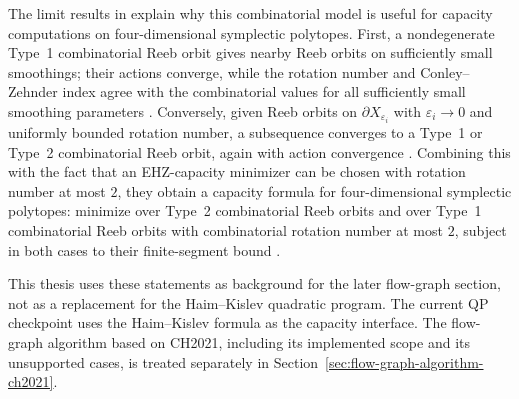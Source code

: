 The limit results in \cite{CH2021} explain why this combinatorial model is
useful for capacity computations on four-dimensional symplectic polytopes.
First, a nondegenerate Type~1 combinatorial Reeb orbit gives nearby Reeb orbits
on sufficiently small smoothings; their actions converge, while the rotation
number and Conley--Zehnder index agree with the combinatorial values for all
sufficiently small smoothing parameters \cite[Theorem~1.8]{CH2021}. Conversely,
given Reeb orbits on \(\partial X_{\varepsilon_i}\) with
\(\varepsilon_i\to0\) and uniformly bounded rotation number, a subsequence
converges to a Type~1 or Type~2 combinatorial Reeb orbit, again with action
convergence \cite[Theorem~1.9]{CH2021}. Combining this with the fact that an
EHZ-capacity minimizer can be chosen with rotation number at most \(2\), they
obtain a capacity formula for four-dimensional symplectic polytopes: minimize
over Type~2 combinatorial Reeb orbits and over Type~1 combinatorial Reeb orbits
with combinatorial rotation number at most \(2\), subject in both cases to
their finite-segment bound \cite[Corollary~1.13]{CH2021}.

This thesis uses these statements as background for the later flow-graph
section, not as a replacement for the Haim--Kislev quadratic program. The
current QP checkpoint uses the Haim--Kislev formula as the capacity interface.
The flow-graph algorithm based on CH2021, including its implemented scope and
its unsupported cases, is treated separately in
Section~\ref{sec:flow-graph-algorithm-ch2021}.

